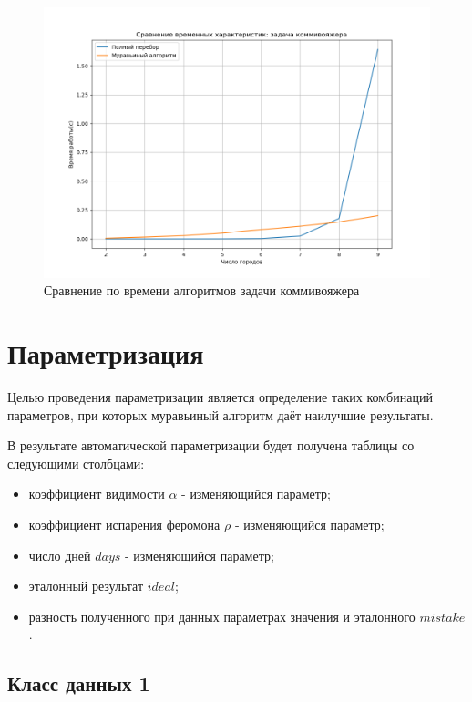 \begin{figure}[H]
	\begin{center}
		\includegraphics[scale=0.5]{img/time.png}
	\end{center}
	\captionsetup{justification=centering}
	\caption{Сравнение по времени алгоритмов задачи коммивояжера}
	\label{img:time}
\end{figure}

\section{Параметризация}

Целью проведения параметризации является определение таких комбинаций параметров, при которых муравьиный алгоритм даёт наилучшие результаты.

В результате автоматической параметризации будет получена таблицы со следующими столбцами:
\begin{itemize}
	\item коэффициент видимости $\alpha$ - изменяющийся параметр;
	\item коэффициент испарения феромона $\rho$ - изменяющийся параметр;
	\item число дней $days$ - изменяющийся параметр;
	\item эталонный результат $ideal$;
	\item разность полученного при данных параметрах значения и эталонного $mistake$.
\end{itemize}

\subsection{Класс данных 1}

